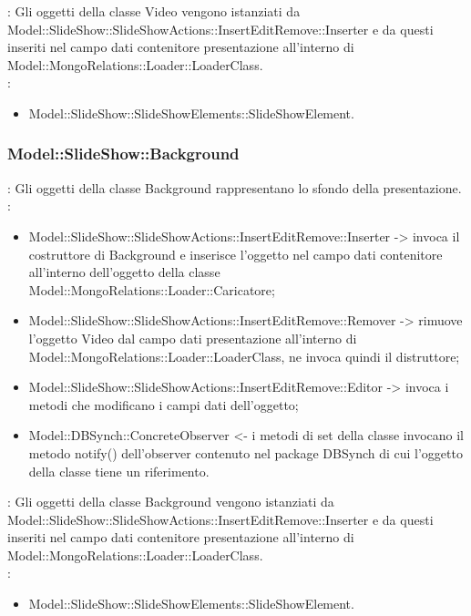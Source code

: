 {{\begin{itemize}
				\end{itemize}	
                \textbf{\interfacce}: Gli oggetti della classe Video vengono istanziati da Model::SlideShow::SlideShowActions::InsertEditRemove::Inserter e da questi inseriti nel campo dati contenitore presentazione all’interno di \\Model::MongoRelations::Loader::LoaderClass.\\
                \textbf{\base}: 
                    \begin{itemize}
                    \item Model::SlideShow::SlideShowElements::SlideShowElement.
                    \end{itemize}
                    }     
                 \subsubsection{Model::SlideShow::Background}{
                				\textbf{\tipo}: Gli oggetti della classe Background rappresentano lo sfondo della presentazione.\\
                				\textbf{\relaz}: 
                				\begin{itemize}
                					\item Model::SlideShow::SlideShowActions::InsertEditRemove::Inserter -> invoca il costruttore di Background e inserisce l’oggetto nel campo dati contenitore all’interno dell’oggetto della classe Model::MongoRelations::Loader::Caricatore;
                                    \item Model::SlideShow::SlideShowActions::InsertEditRemove::Remover -> rimuove l’oggetto Video dal campo dati presentazione all’interno di Model::MongoRelations::Loader::LoaderClass, ne invoca quindi il distruttore;
                                    \item Model::SlideShow::SlideShowActions::InsertEditRemove::Editor -> invoca i metodi che modificano i campi dati dell'oggetto;
                    \item Model::DBSynch::ConcreteObserver <- i metodi di set della classe invocano il metodo notify() dell'observer contenuto nel package DBSynch di cui l'oggetto della classe tiene un riferimento.
                				\end{itemize}	
                                \textbf{\interfacce}: Gli oggetti della classe Background vengono istanziati da Model::SlideShow::SlideShowActions::InsertEditRemove::Inserter e da questi inseriti nel campo dati contenitore presentazione all’interno di\\ Model::MongoRelations::Loader::LoaderClass.\\
                                \textbf{\base}: 
                                    \begin{itemize}
                                    \item Model::SlideShow::SlideShowElements::SlideShowElement.
                                    \end{itemize}
                                    }              
}


